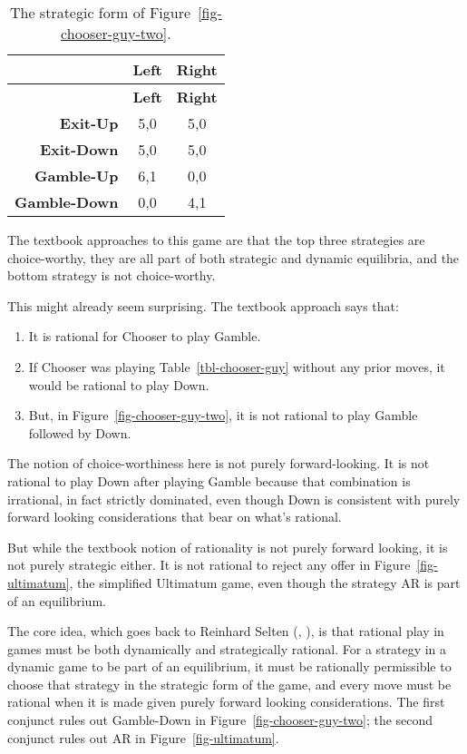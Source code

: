 \documentclass[
  10pt,
  letterpaper,
  DIV=11,
  numbers=noendperiod,
  twoside]{scrartcl}
\providecommand{\tightlist}{%
  \setlength{\itemsep}{0pt}\setlength{\parskip}{0pt}}\usepackage{longtable,booktabs,array}
\begin{document}
\begin{longtable}[]{@{}rcc@{}}
\caption{The strategic form of
Figure~\ref{fig-chooser-guy-two}.}\label{tbl-chooser-guy-two}\tabularnewline
\toprule\noalign{}
& \textbf{Left} & \textbf{Right} \\
\midrule\noalign{}
\endfirsthead
\toprule\noalign{}
& \textbf{Left} & \textbf{Right} \\
\midrule\noalign{}
\endhead
\bottomrule\noalign{}
\endlastfoot
\textbf{Exit-Up } & 5,0 & 5,0 \\
\textbf{Exit-Down } & 5,0 & 5,0 \\
\textbf{Gamble-Up } & 6,1 & 0,0 \\
\textbf{Gamble-Down} & 0,0 & 4,1 \\
\end{longtable}

The textbook approaches to this game are that the top three strategies
are choice-worthy, they are all part of both strategic and dynamic
equilibria, and the bottom strategy is not choice-worthy.

This might already seem surprising. The textbook approach says that:

\begin{enumerate}
\def\labelenumi{\arabic{enumi}.}
\tightlist
\item
  It is rational for Chooser to play Gamble.
\item
  If Chooser was playing Table~\ref{tbl-chooser-guy} without any prior
  moves, it would be rational to play Down.
\item
  But, in Figure~\ref{fig-chooser-guy-two}, it is not rational to play
  Gamble followed by Down.
\end{enumerate}

The notion of choice-worthiness here is not purely forward-looking. It
is not rational to play Down after playing Gamble because that
combination is irrational, in fact strictly dominated, even though Down
is consistent with purely forward looking considerations that bear on
what's rational.

But while the textbook notion of rationality is not purely forward
looking, it is not purely strategic either. It is not rational to reject
any offer in Figure~\ref{fig-ultimatum}, the simplified Ultimatum game,
even though the strategy AR is part of an equilibrium.

The core idea, which goes back to Reinhard Selten
(, ), is
that rational play in games must be both dynamically and strategically
rational. For a strategy in a dynamic game to be part of an equilibrium,
it must be rationally permissible to choose that strategy in the
strategic form of the game, and every move must be rational when it is
made given purely forward looking considerations. The first conjunct
rules out Gamble-Down in Figure~\ref{fig-chooser-guy-two}; the second
conjunct rules out AR in Figure~\ref{fig-ultimatum}.
\end{document}
